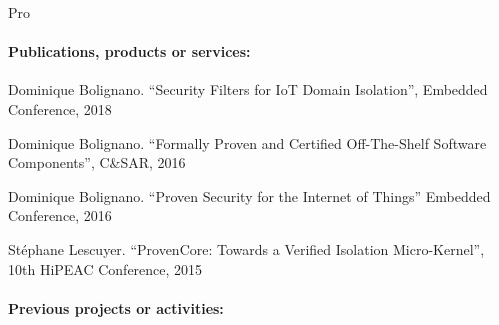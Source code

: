 \begin{sitedescription}{Pro}
\paragraph*{Publications, products or services:}


\begin{compactitem}
\item Dominique Bolignano. ``Security Filters for IoT Domain
  Isolation'', Embedded Conference, 2018
\item Dominique Bolignano. ``Formally Proven and Certified
  Off-The-Shelf Software Components'', C\&SAR,
  2016
\item Dominique Bolignano. ``Proven Security for the Internet of
  Things'' Embedded Conference, 2016
\item Stéphane Lescuyer. ``ProvenCore: Towards a Verified Isolation
  Micro-Kernel'', 10th HiPEAC Conference, 2015
\end{compactitem}

\paragraph*{Previous projects or activities:}



\end{sitedescription}
